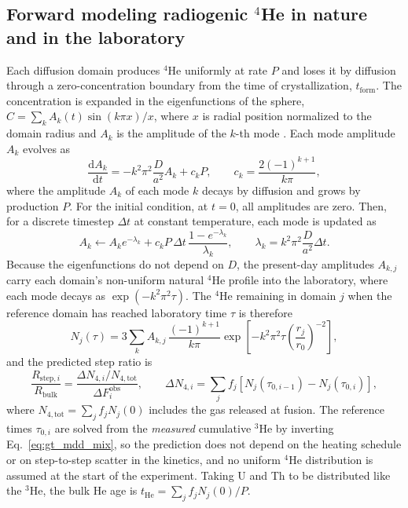 \subsection{Forward modeling radiogenic $^4$He in nature and in the laboratory}\label{sec:4he-forward}
Each diffusion domain produces $^4$He uniformly at rate $P$ and loses it by diffusion through a zero-concentration
boundary from the time of crystallization, $t_\mathrm{form}$. The concentration is
expanded in the eigenfunctions of the sphere, $C=\sum_kA_k(t)\sin(k\pi x)/x$, where $x$ is
radial position normalized to the domain radius and $A_k$ is the amplitude of the $k$-th mode \citep{carslawjaeger1959}.
Each mode amplitude $A_k$ evolves as
\begin{equation}
  \frac{\mathrm{d}A_k}{\mathrm{d}t}=-k^2\pi^2\frac{D}{a^2}A_k+c_kP,\qquad c_k=\frac{2(-1)^{k+1}}{k\pi},
  \label{eq:ch2-si-mdd-modes}
\end{equation}
where the amplitude $A_k$ of each mode $k$ decays by diffusion and grows by production $P$. For the initial condition, 
at $t=0$, all amplitudes are zero. Then, for a discrete timestep $\Delta t$ at constant temperature, each mode is updated as
\begin{equation}
  A_k \leftarrow A_k e^{-\lambda_k}+c_kP\,\Delta t\,\frac{1-e^{-\lambda_k}}{\lambda_k},
  \qquad \lambda_k=k^2\pi^2\frac{D}{a^2}\Delta t .
\end{equation}
Because the  eigenfunctions do not depend on $D$, the present-day amplitudes $A_{k,j}$ carry each
domain's non-uniform natural $^4$He profile into the laboratory, where each mode decays as
$\exp(-k^2\pi^2\tau)$. The $^4$He remaining in domain $j$ when the reference domain has
reached laboratory time $\tau$ is therefore
\begin{equation}
  N_j(\tau)=3\sum_k A_{k,j}\,\frac{(-1)^{k+1}}{k\pi}\exp\!\left[-k^2\pi^2\tau\left(\frac{r_j}{r_0}\right)^{-2}\right],
  \label{eq:gt_mdd_N4}
\end{equation}
and the predicted step ratio is
\begin{equation}
  \frac{R_{\mathrm{step},i}}{R_\mathrm{bulk}}=\frac{\Delta N_{4,i}/N_{4,\mathrm{tot}}}{\Delta F_i^{\mathrm{obs}}},
  \qquad
  \Delta N_{4,i}=\sum_jf_j\left[N_j(\tau_{0,i-1})-N_j(\tau_{0,i})\right],
  \label{eq:gt_mdd_ratio}
\end{equation}
where $N_{4,\mathrm{tot}}=\sum_jf_jN_j(0)$ includes the gas released at fusion. The
reference times $\tau_{0,i}$ are solved from the \emph{measured} cumulative $^3$He by
inverting Eq.~\eqref{eq:gt_mdd_mix}, so the prediction does not depend on the heating
schedule or on step-to-step scatter in the kinetics, and no uniform $^4$He distribution is
assumed at the start of the experiment. Taking U and Th to be distributed like the $^3$He,
the bulk He age is $t_\mathrm{He}=\sum_jf_jN_j(0)/P$.

